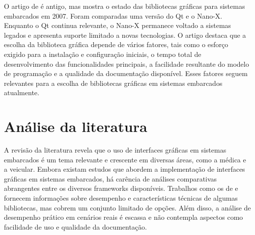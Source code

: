 O artigo de \cite{ChoosingAGUILibrary} é antigo, mas mostra o estado das bibliotecas gráficas para sistemas embarcados em 2007. Foram comparadas uma versão do Qt e o Nano-X. Enquanto o Qt continua relevante, o Nano-X permanece voltado a sistemas legados e apresenta suporte limitado a novas tecnologias. O artigo destaca que a escolha da biblioteca gráfica depende de vários fatores, tais como o esforço exigido para a instalação e configuração iniciais, o tempo total de desenvolvimento das funcionalidades principais, a facilidade resultante do modelo de programação e a qualidade da documentação disponível. Esses fatores seguem relevantes para a escolha de bibliotecas gráficas em sistemas embarcados atualmente.

\section{Análise da literatura}

A revisão da literatura revela que o uso de interfaces gráficas em sistemas embarcados é um tema relevante e crescente em diversas áreas, como a médica e a veicular. Embora existam estudos que abordem a implementação de interfaces gráficas em sistemas embarcados, há carência de análises comparativas abrangentes entre os diversos frameworks disponíveis. Trabalhos como os de \cite{Marciano} e \cite{ISNAS2021Comparison} fornecem informações sobre desempenho e características técnicas de algumas bibliotecas, mas cobrem um conjunto limitado de opções. Além disso, a análise de desempenho prático em cenários reais é escassa e não contempla aspectos como facilidade de uso e qualidade da documentação.

